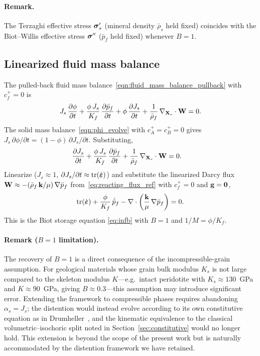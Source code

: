 \documentclass[11pt]{article}
\begin{document}
\paragraph{Remark.}  The Terzaghi effective stress $\boldsymbol{\sigma}'_s$ (mineral density $\bar{\rho}_s$ held fixed) coincides with the Biot--Willis effective stress $\boldsymbol{\sigma}''$ ($\bar{p}_f$ held fixed) whenever $B = 1$.

\subsection{Linearized fluid mass balance}

The pulled-back fluid mass balance~\eqref{eqn:fluid_mass_balance_pullback} with $c^+_f = 0$ is
%
\[
  J_s\,\frac{\partial \phi}{\partial t} + \frac{\phi\, J_s}{K_f}\,\frac{\partial \bar{p}_f}{\partial t} + \phi\,\frac{\partial J_s}{\partial t} + \frac{1}{\bar{\rho}_f}\,\nabla_{\mathbf{X}_s} \cdot \mathbf{W} = 0.
\]
%
The solid mass balance~\eqref{eqn:phi_evolve} with $c^+_A = c^+_B = 0$ gives $J_s\,\partial\phi/\partial t = (1 - \phi)\,\partial J_s/\partial t$.  Substituting,
%
\begin{align*}
  \frac{\partial J_s}{\partial t} + \frac{\phi\,J_s}{K_f}\,\frac{\partial \bar{p}_f}{\partial t} + \frac{1}{\bar{\rho}_f}\,\nabla_{\mathbf{X}_s} \cdot \mathbf{W} &= 0.
\end{align*}
%
Linearize ($J_s \approx 1$, $\partial J_s / \partial t \approx \mbox{tr}(\dot{\boldsymbol{\varepsilon}})$) and substitute the linearized Darcy flux $\mathbf{W} \approx -(\bar{\rho}_f\,\mathbf{k}/\mu)\,\nabla \bar{p}_f$ from~\eqref{eq:reacting_flux_ref} with $c^+_f = 0$ and $\mathbf{g} = \mathbf{0}$,
%
\begin{equation*}
  \mbox{tr}(\dot{\boldsymbol{\varepsilon}}) + \frac{\phi}{K_f}\,\dot{\bar{p}}_f - \nabla \cdot \left(\frac{\mathbf{k}}{\mu}\,\nabla \bar{p}_f\right) = 0.
\end{equation*}
%
This is the Biot storage equation \eqref{eq:infb} with $B = 1$ and $1/M = \phi/K_f$.

\paragraph{Remark ($B = 1$ limitation).}  The recovery of $B = 1$ is a direct consequence of the incompressible-grain assumption.  For geological materials whose grain bulk modulus $K_s$ is not large compared to the skeleton modulus $K$---e.g.\ intact peridotite with $K_s \approx 130$~GPa and $K \approx 90$~GPa, giving $B \approx 0.3$---this assumption may introduce significant error.  Extending the framework to compressible phases requires abandoning $\alpha_s = J_s$; the distention would instead evolve according to its own constitutive equation as in Drumheller~\cite{drumheller2000}, and the kinematic equivalence to the classical volumetric--isochoric split noted in Section~\ref{sec:constitutive} would no longer hold.  This extension is beyond the scope of the present work but is naturally accommodated by the distention framework we have retained.



\end{document}
